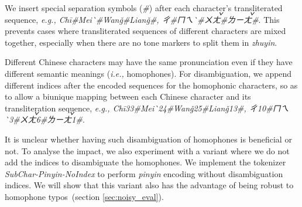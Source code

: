 We insert special separation symbols (\textit{\#}) after each character's transliterated sequence, \textit{e.g., Chi\={}\#Mei\`{}\#Wang\v{}\#Liang\v{}\#, ㄔ\#ㄇㄟ\`{}\#ㄨㄤ\v{}\#ㄌㄧㄤ\v{}\#}. This prevents cases where transliterated sequences of different characters are mixed together, especially when there are no tone markers to split them in \textit{zhuyin}.
  
 Different Chinese characters may have the same pronunciation even if they have different semantic meanings (\textit{i.e.,} homophones). For disambiguation, we append different indices after the encoded sequences for the homophonic characters, so as to allow a biunique mapping between each Chinese character and its transliteration sequence, \textit{e.g., Chi\={}33\#Mei\`{}24\#Wang\v{}25\#Liang\v{}13\#, ㄔ10\#ㄇㄟ\`{}3\#ㄨㄤ\v{}6\#ㄌㄧㄤ\v{}1\#}. 

It is unclear whether having such disambiguation of homophones is beneficial or not. To analyse the impact, we also experiment with a variant where we do not add the indices to disambiguate the homophones. We implement the tokenizer \textit{SubChar-Pinyin-NoIndex} to perform \textit{pinyin} encoding without disambiguation indices.
We will show that this variant also has the advantage of being robust to homophone typos~(section \ref{sec:noisy_eval}). 


